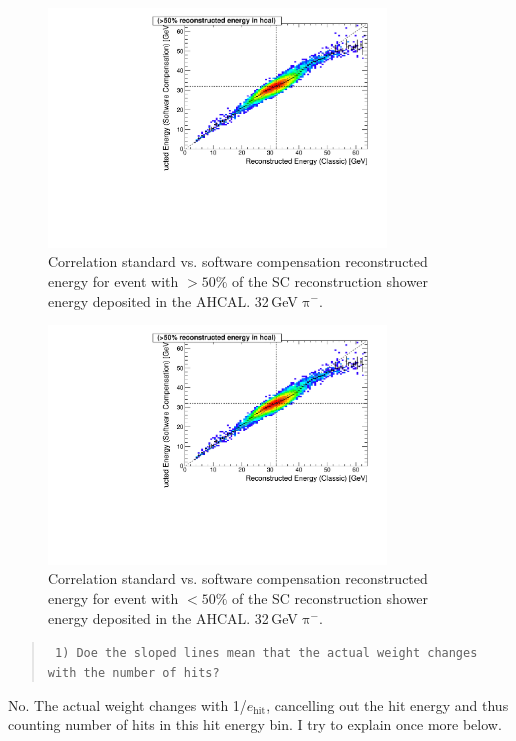 \documentclass[twoside,a4paper,12pt]{article}
\newcommand\piminus{\(\mathrm{\pi^-}\)}
\begin{document}
\begin{figure}[t]
\begin{center}
\includegraphics[width=0.8\textwidth,page=3]{ERec_corr_jerry_560474_data}
\caption{Correlation standard vs. software compensation reconstructed energy for event with $> 50\%$ of the SC reconstruction shower energy deposited in the AHCAL. 32\,GeV \piminus.}
\label{fig:jerry3}
\end{center}
\end{figure}
\begin{figure}[b]
\begin{center}
\includegraphics[width=0.8\textwidth,page=4]{ERec_corr_jerry_560474_data}
\caption{Correlation standard vs. software compensation reconstructed energy for event with $< 50\%$ of the SC reconstruction shower energy deposited in the AHCAL. 32\,GeV \piminus.}
\label{fig:jerry4}
\end{center}
\end{figure}

\clearpage
\begin{quote}\texttt{
1) Doe the sloped lines mean that the actual weight changes with the number of hits?}\end{quote}
No. The actual weight changes with 1/$e_\text{hit}$, cancelling out the hit energy and thus counting number of hits in this hit energy bin. I try to explain once more below.
\end{document}
